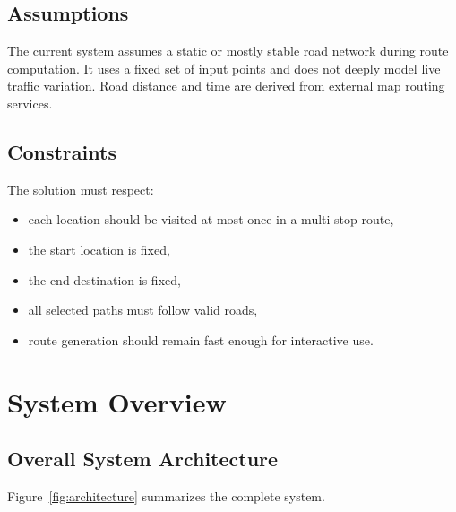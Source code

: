 \subsection{Assumptions}
The current system assumes a static or mostly stable road network during route computation. It uses a fixed set of input points and does not deeply model live traffic variation. Road distance and time are derived from external map routing services.

\subsection{Constraints}
The solution must respect:
\begin{itemize}[leftmargin=1.5em]
    \item each location should be visited at most once in a multi-stop route,
    \item the start location is fixed,
    \item the end destination is fixed,
    \item all selected paths must follow valid roads,
    \item route generation should remain fast enough for interactive use.
\end{itemize}

\section{System Overview}
\subsection{Overall System Architecture}
Figure~\ref{fig:architecture} summarizes the complete system.

